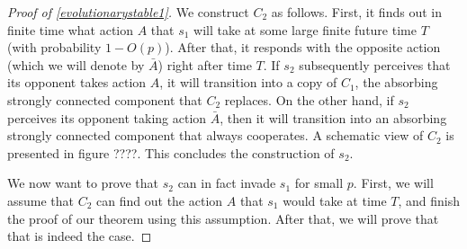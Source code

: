 \documentclass[11pt]{amsart}
\theoremstyle{definition}
\theoremstyle{remark}
\begin{document}
\begin{proof}[Proof of \cref{evolutionarystable1}]
      We construct $C_2$ as follows. First, it finds out in finite time what action $A$ that $s_1$ will take at some large finite future time $T$ (with probability $1 - O(p)$). 
      After that, it responds with the opposite action (which we will denote by $\bar{A}$) right after time $T$. 
      If $s_2$ subsequently perceives that its opponent takes action $A$, it will transition into a copy of $C_1$, the absorbing strongly connected component that $C_2$ replaces. On the other hand, if $s_2$ perceives its opponent taking action $\bar{A}$, then it will transition into an absorbing strongly connected component that always cooperates. A schematic view of $C_2$ is presented in figure ????. This concludes the construction of $s_2$.


      We now want to prove that $s_2$ can in fact invade $s_1$ for small $p$. First, we will assume that $C_2$ can find out the action $A$ that $s_1$ would take at time $T$, and finish the proof of our theorem using this assumption. After that, we will prove that that is indeed the case.


\end{proof}
\end{document}
